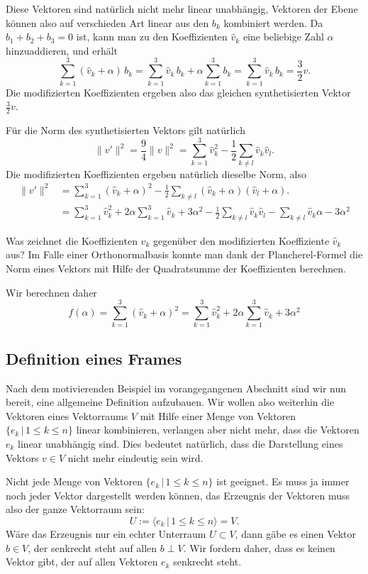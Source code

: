 Diese Vektoren sind natürlich nicht mehr linear unabhängig, Vektoren
der Ebene können also auf verschieden Art linear aus den $b_k$ kombiniert
werden.
Da $b_1+b_2+b_3=0$ ist, kann man zu den Koeffizienten $\hat{v}_k$
eine beliebige Zahl $\alpha$ hinzuaddieren, und erhält
\[
\sum_{k=1}^3 (\hat{v}_k+\alpha)\, b_k
=
\sum_{k=1}^3 \hat{v}_k\,b_k
+\alpha
\sum_{k=1}^3 b_k
=
\sum_{k=1}^3 \hat{v}_k\,b_k
=
\frac32 v.
\]
Die modifizierten Koeffizienten ergeben also das gleichen synthetisierten
Vektor $\frac32 v$.

Für die Norm des synthetisierten Vektors gilt natürlich
\[
\|v'\|^2
=
\frac94\|v\|^2
=
\sum_{k=1}^3 \hat{v}_k^2 
-
\frac12\sum_{k\ne l} \hat{v}_k\hat{v}_l.
\]
Die modifizierten Koeffizienten ergeben natürlich dieselbe Norm, also
\begin{align*}
\|v'\|^2
&=
\sum_{k=1}^3 (\hat{v}_k+\alpha)^2 
-
\frac12\sum_{k\ne l} (\hat{v}_k+\alpha)(\hat{v}_l+\alpha).
\\
&=
\sum_{k=1}^3 \hat{v}_k^2
+2\alpha \sum_{k=1}^3 \hat{v}_k
+3\alpha^2
-
\frac12\sum_{k\ne l} \hat{v}_k\hat{v}_l
-
\sum_{k\ne l} \hat{v}_k \alpha
-
3\alpha^2
\end{align*}


Was zeichnet die Koeffizienten $\hat{v}_k$ gegenüber den modifizierten
Koeffiziente $\hat{v}_k$ aus?
Im Falle einer Orthonormalbasis konnte man dank der Plancherel-Formel
die Norm eines Vektors mit Hilfe der Quadratsumme der Koeffizienten
berechnen.

Wir berechnen daher
\[
f(\alpha)
=
\sum_{k=1}^3 (\hat{v}_k+\alpha)^2
=
\sum_{k=1}^3 \hat{v}_k^2 + 2\alpha \sum_{k=1}^3 \hat{v}_k + 3\alpha^2
\]

\subsection{Definition eines Frames}
Nach dem motivierenden Beispiel im vorangegangenen Abschnitt sind wir nun
bereit, eine allgemeine Definition aufzubauen.
Wir wollen also weiterhin die Vektoren eines Vektorraums $V$ mit Hilfe
einer Menge von Vektoren $\{e_k\,|\,1\le k\le n\}$ linear kombinieren,
verlangen aber nicht mehr, dass die Vektoren $e_k$ linear unabhängig sind.
Dies bedeutet natürlich, dass die Darstellung eines Vektors $v\in V$
nicht mehr eindeutig sein wird.

Nicht jede Menge von Vektoren $\{e_k\,|\,1\le k\le n\}$ ist geeignet.
Es muss ja immer noch jeder Vektor dargestellt werden können, das
Erzeugnis der Vektoren muss also der ganze Vektorraum sein:
\[
U
:=
\langle e_k\,|\,1\le k\le n\rangle
=
V.
\]
Wäre das Erzeugnis nur ein echter Unterraum $U\subset V$, dann gäbe es
einen Vektor $b\in V$, der senkrecht steht auf allen $b\perp V$.
Wir fordern daher, dass es keinen Vektor gibt, der auf allen Vektoren $e_k$
senkrecht steht.

